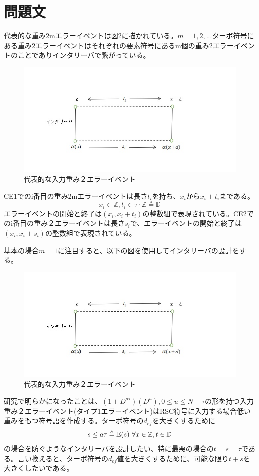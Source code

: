 \documentclass[20 pts]{article}
\begin{document}
\section{問題文}
代表的な重み2mエラーイベントは図2に描かれている。$m=1,2,...$ターボ符号にある重み2エラーイベントはそれぞれの要素符号にあるm個の重み2エラーイベントのことでありインタリーバで繋がっている。
\begin{figure}[h!]
\includegraphics[width=\textwidth]{weight2error.jpg}
\caption{代表的な入力重み２エラーイベント}
\label{}
\end{figure}
CE1でのi番目の重み2mエラーイベントは長さ$t_i$を持ち、$x_i$から$x_i+t_i$まである。\\$$x_i \in \mathbb{Z},  t_i \in \tau \cdot \mathbb{Z} \triangleq \mathbb{D}$$エラーイベントの開始と終了は$(x_i,x_i+t_i)$の整数組で表現されている。CE2でのi番目の重み２エラーイベントは長さ$s_i$で、エラーイベントの開始と終了は$(x_i,x_i+s_i)$の整数組で表現されている。

基本の場合$m=1$に注目すると、以下の図を使用してインタリーバの設計をする。
\begin{figure}[h!]
\includegraphics[width=\textwidth]{weight2error.jpg}
\caption{代表的な入力重み２エラーイベント}
\label{}
\end{figure}
研究で明らかになったことは、$(1+D^{a\tau})(D^u) ,0\leq u\leq N-\tau$の形を持つ入力重み２エラーイベント(タイプ1エラーイベント)はRSC符号に入力する場合低い重みをもつ符号語を作成する。ターボ符号の$d_{ef}$を大きくするために$$s \leq a\tau \triangleq \mathbb{E}(s) \\\\\ \forall x \in \mathbb{Z} , t \in \mathbb{D}$$の場合を防ぐようなインタリーバを設計したい、特に最悪の場合の$t = s =\tau$である。言い換えると、ターボ符号の$d_{ef}$値を大きくするために、可能な限り$t+s$を大きくしたいである。
\end{document}
